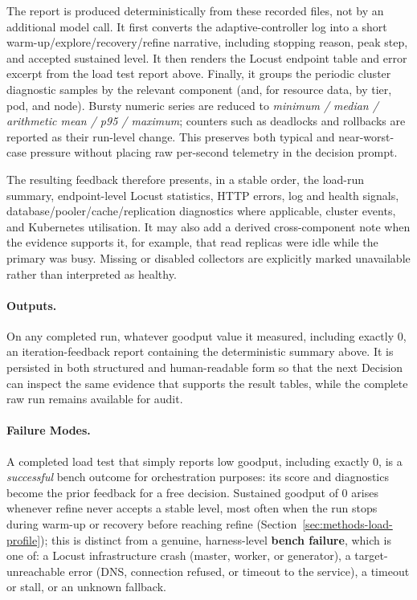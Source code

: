The report is produced deterministically from these recorded files, not
by an additional model call. It first converts the adaptive-controller
log into a short warm-up/explore/recovery/refine narrative, including
stopping reason, peak step, and accepted sustained level. It then
renders the Locust endpoint table and error excerpt from the load test
report above. Finally, it groups the periodic cluster diagnostic samples
by the relevant component (and, for resource data, by tier, pod, and
node). Bursty numeric series are reduced to
\emph{minimum / median / arithmetic mean / p95 / maximum}; counters such
as deadlocks and rollbacks are reported as their run-level change. This
preserves both typical and near-worst-case pressure without placing raw
per-second telemetry in the decision prompt.

The resulting feedback therefore presents, in a stable order, the load-run
summary, endpoint-level Locust statistics, HTTP errors, log and health
signals, database/pooler/cache/replication diagnostics where applicable,
cluster events, and Kubernetes utilisation.  It may also add a derived
cross-component note when the evidence supports it, for example, that read
replicas were idle while the primary was busy.  Missing or disabled
collectors are explicitly marked unavailable rather than interpreted as
healthy.

\paragraph{Outputs.}
On any completed run, whatever goodput value it measured, including exactly
$0$, an iteration-feedback report containing the deterministic summary
above.  It is persisted in both structured and human-readable form so that
the next Decision can inspect the same evidence that supports the result
tables, while the complete raw run remains available for audit.

\paragraph{Failure Modes.}
A completed load test that simply reports low goodput, including exactly
$0$, is a \emph{successful} bench outcome for orchestration purposes: its
score and diagnostics become the prior feedback for a free decision.
Sustained goodput of $0$ arises whenever refine never accepts a stable
level, most often when the run stops during warm-up or recovery before
reaching refine (Section~\ref{sec:methods-load-profile}); this is distinct
from a genuine,
harness-level \textbf{bench failure}, which is one of: a Locust
infrastructure crash (master, worker, or generator), a target-unreachable
error (DNS, connection refused, or timeout to the service), a timeout or
stall, or an unknown fallback.

